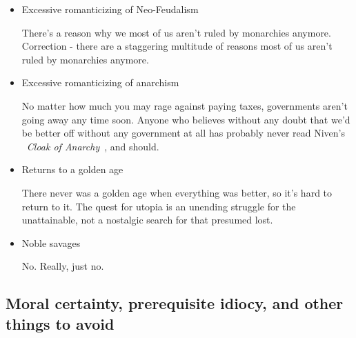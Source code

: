 \begin{itemize}
\begin{itemize}
\item Excessive romanticizing of Neo-Feudalism

There's a reason why we most of us aren't ruled by monarchies
anymore. Correction - there are a staggering multitude of reasons most
of us aren't ruled by monarchies anymore.

\item Excessive romanticizing of anarchism

No matter how much you may rage against paying taxes, governments
aren't going away any time soon. Anyone who believes without any doubt
that we'd be better off without any government at all has probably
never read Niven's ~\emph{Cloak of
Anarchy}~\cite{PurpleRobeofAnarchy}, and should.

\item Returns to a golden age

There never was a golden age when everything was better, so it's hard
to return to it. The quest for utopia is an unending struggle for the
unattainable, not a nostalgic search for that presumed lost.

\item Noble savages

No. Really, just no.

\end{itemize}

\end{itemize}

\subsection{Moral certainty, prerequisite idiocy, and other things to avoid} 

